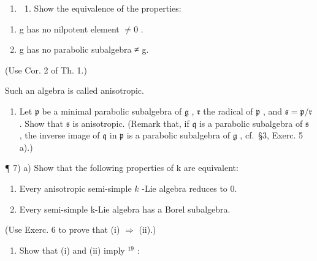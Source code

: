 \begin{enumerate}
\def\labelenumi{\arabic{enumi})}
\setcounter{enumi}{5}
\tightlist
\item
  \begin{enumerate}
  \def\labelenumii{\alph{enumii})}
  \tightlist
  \item
    Show the equivalence of the properties:
  \end{enumerate}
\end{enumerate}

\begin{enumerate}
\def\labelenumi{(\roman{enumi})}
\item
  g has no nilpotent element \(\neq 0\) .
\item
  g has no parabolic subalgebra ≠ g.
\end{enumerate}

(Use Cor. 2 of Th. 1.)

Such an algebra is called anisotropic.

\begin{enumerate}
\def\labelenumi{\alph{enumi})}
\setcounter{enumi}{1}
\tightlist
\item
  Let \(\mathfrak{p}\) be a minimal parabolic subalgebra of \(\mathfrak{g}\) , \(\mathfrak{r}\) the radical of \(\mathfrak{p}\) , and \(\mathfrak{s} = \mathfrak{p} / \mathfrak{r}\) . Show that \(\mathfrak{s}\) is anisotropic. (Remark that, if \(\mathfrak{q}\) is a parabolic subalgebra of \(\mathfrak{s}\) , the inverse image of \(\mathfrak{q}\) in \(\mathfrak{p}\) is a parabolic subalgebra of \(\mathfrak{g}\) , cf.~§3, Exerc. 5 a).)
\end{enumerate}

¶ 7) a) Show that the following properties of k are equivalent:

\begin{enumerate}
\def\labelenumi{(\roman{enumi})}
\item
  Every anisotropic semi-simple \(k\) -Lie algebra reduces to 0.
\item
  Every semi-simple k-Lie algebra has a Borel subalgebra.
\end{enumerate}

(Use Exerc. 6 to prove that (i) \(\Longrightarrow\) (ii).)

\begin{enumerate}
\def\labelenumi{\alph{enumi})}
\setcounter{enumi}{1}
\tightlist
\item
  Show that (i) and (ii) imply \(^{19}\) :
\end{enumerate}

